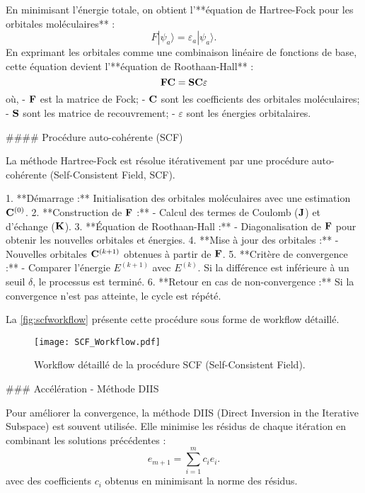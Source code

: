 \documentclass[12pt,a4paper]{report}
\begin{document}
\begin{markdown}
En minimisant l'énergie totale, on obtient l'**équation de Hartree-Fock pour les orbitales moléculaires** :
\begin{equation}
F|\psi_a\rangle = \varepsilon_a|\psi_a\rangle .
\end{equation}
En exprimant les orbitales comme une combinaison linéaire de fonctions de base, cette équation devient l'**équation de Roothaan-Hall** :
\begin{equation}
\vb{F}\vb{C} = \vb{S}\vb{C}\varepsilon
\end{equation}
où,
- $\vb{F}$ est la matrice de Fock;
- $\vb{C}$ sont les coefficients des orbitales moléculaires;
- $\vb{S}$ sont les matrice de recouvrement;
- $\varepsilon$ sont les énergies orbitalaires.

#### Procédure auto-cohérente (SCF)

La méthode Hartree-Fock est résolue itérativement par une procédure auto-cohérente (Self-Consistent Field, SCF).

1. **Démarrage :** Initialisation des orbitales moléculaires avec une estimation $\vb{C}^{(0)}$.
2. **Construction de $\vb{F}$ :**
   - Calcul des termes de Coulomb ($\vb{J}$) et d'échange ($\vb{K}$).
3. **Équation de Roothaan-Hall :**
   - Diagonalisation de $\vb{F}$ pour obtenir les nouvelles orbitales et énergies.
4. **Mise à jour des orbitales :**
   - Nouvelles orbitales $\vb{C}^{(k+1)}$ obtenues à partir de $\vb{F}$.
5. **Critère de convergence :**
   - Comparer l'énergie $E^{(k+1)}$ avec $E^{(k)}$. Si la différence est inférieure à un seuil $\delta$, le processus est terminé.
6. **Retour en cas de non-convergence :** Si la convergence n’est pas atteinte, le cycle est répété.

La \autoref{fig:scfworkflow} présente cette procédure sous forme de workflow détaillé.

\begin{figure}[tbh]
\centering
\texttt{[image: SCF\_Workflow.pdf]}
\caption{Workflow détaillé de la procédure SCF (Self-Consistent Field).}
\label{fig:scfworkflow}
\end{figure}

### Accélération - Méthode DIIS

Pour améliorer la convergence, la méthode DIIS (Direct Inversion in the Iterative Subspace) est souvent utilisée. Elle minimise les résidus de chaque itération en combinant les solutions précédentes :
\begin{equation}
e_{m+1} = \sum_{i=1}^m c_i e_i.
\end{equation}
avec des coefficients $c_i$ obtenus en minimisant la norme des résidus.


\end{markdown}
\end{document}
